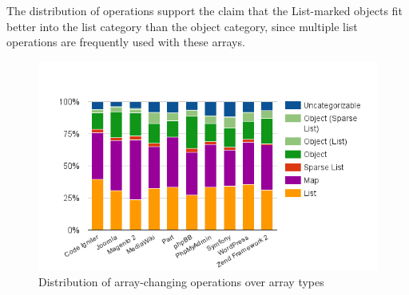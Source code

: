 The distribution of operations support the claim that the List-marked objects fit better into the list category than the object category, since multiple list operations are frequently used with these arrays. 


\begin{figure}[htbp]
\centering
\includegraphics[width=\textwidth]{chapters/study/g22.png}
\caption{Distribution of array-changing operations over array types}
\label{fig:type_operations}
\end{figure}
